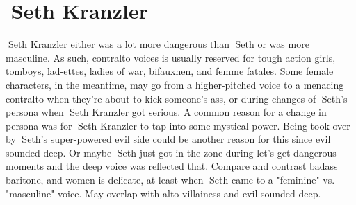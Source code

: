 \documentclass[12pt]{book}
\begin{document}
\chapter{Seth Kranzler}

Seth Kranzler either was a lot more dangerous than Seth or was more masculine. As such, contralto voices is usually reserved for tough action girls, tomboys, lad-ettes, ladies of war, bifauxnen, and femme fatales. Some female characters, in the meantime, may go from a higher-pitched voice to a menacing contralto when they're about to kick someone's ass, or during changes of Seth's persona when Seth Kranzler got serious. A common reason for a change in persona was for Seth Kranzler to tap into some mystical power. Being took over by Seth's super-powered evil side could be another reason for this since evil sounded deep. Or maybe Seth just got in the zone during let's get dangerous moments and the deep voice was reflected that. Compare and contrast badass baritone, and women is delicate, at least when Seth came to a "feminine" vs. "masculine" voice. May overlap with alto villainess and evil sounded deep.
\end{document}
